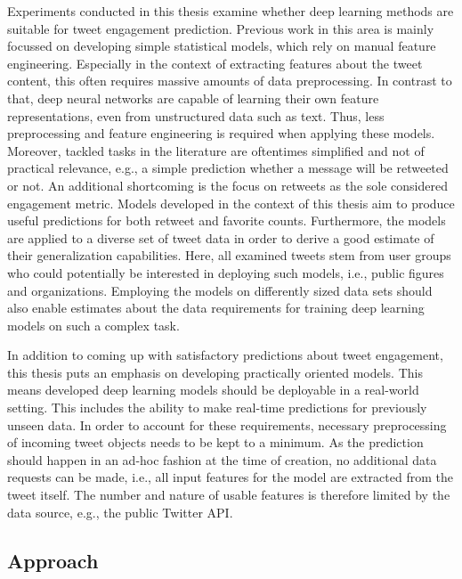Experiments conducted in this thesis examine whether deep learning methods are
suitable for tweet engagement prediction.
Previous work in this area is mainly focussed on developing simple statistical
models, which rely on manual feature engineering.
Especially in the context of extracting features about the tweet content, this
often requires massive amounts of data preprocessing.
In contrast to that, deep neural networks are capable of learning their own 
feature representations, even from unstructured data such as text.
Thus, less preprocessing and feature engineering is required when applying
these models.
Moreover, tackled tasks in the literature are oftentimes simplified and not of 
practical relevance, e.g., a simple prediction whether a message will be 
retweeted or not.
An additional shortcoming is the focus on retweets as the sole considered
engagement metric.
Models developed in the context of this thesis aim to produce useful predictions
for both retweet and favorite counts.
Furthermore, the models are applied to a diverse set of tweet data in order
to derive a good estimate of their generalization capabilities.
Here, all examined tweets stem from user groups who could potentially be interested
in deploying such models, i.e., public figures and organizations.
Employing the models on differently sized data sets should also enable estimates
about the data requirements for training deep learning models on such a complex
task.

In addition to coming up with satisfactory predictions about tweet engagement,
this thesis puts an emphasis on developing practically oriented models.
This means developed deep learning models should be deployable in a real-world
setting.
This includes the ability to make real-time predictions for previously unseen
data.
In order to account for these requirements, necessary preprocessing of incoming
tweet objects needs to be kept to a minimum.
As the prediction should happen in an ad-hoc fashion at the time of creation,
no additional data requests can be made, i.e., all input features for the model
are extracted from the tweet itself.
The number and nature of usable features is therefore limited by the data source,
e.g., the public Twitter API.

\subsection{Approach}
\label{sec:approach}


